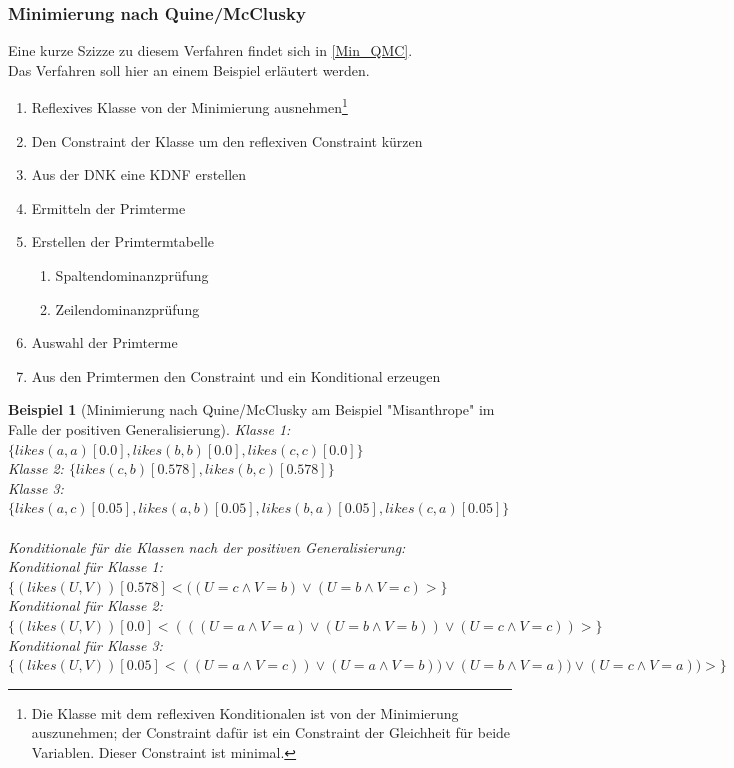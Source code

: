 \documentclass[a4paper, 11pt]{book}
\newtheorem{Bsp}{Beispiel}[section]
\begin{document}
{\subsubsection{Minimierung nach Quine/McClusky} \label{Min_Besch_QMC} 
Eine kurze Szizze zu diesem Verfahren findet sich in \ref{Min_QMC}.\\
Das Verfahren soll hier an einem Beispiel erläutert werden.
\begin{enumerate}
	\item Reflexives Klasse von der Minimierung ausnehmen\footnote{Die Klasse mit dem reflexiven Konditionalen ist von der Minimierung auszunehmen; der Constraint dafür ist ein Constraint der Gleichheit für beide Variablen. Dieser Constraint ist minimal.}
	\item Den Constraint der Klasse um den reflexiven Constraint kürzen
	\item Aus der DNK eine KDNF erstellen 
	\item Ermitteln der Primterme
	\item Erstellen der Primtermtabelle
	\begin{enumerate}
		\item Spaltendominanzprüfung
		\item Zeilendominanzprüfung
	\end{enumerate}
	\item Auswahl der Primterme
	\item Aus den Primtermen den Constraint und ein Konditional erzeugen	
\end{enumerate}
\begin{Bsp}[Minimierung nach Quine/McClusky am Beispiel "{}Misanthrope"{} im Falle der positiven Generalisierung]
	Klasse 1: $ \{likes(a,a)[0.0], likes(b,b)[0.0], likes(c,c)[0.0]\} $\\
	Klasse 2: $ \{likes(c,b)[0.578], likes(b,c)[0.578]\} $\\
	Klasse 3: $ \{likes(a,c)[0.05], likes(a,b)[0.05], likes(b,a)[0.05], likes(c,a)[0.05]\} $\\
	\\
	\noindent
	Konditionale für die Klassen nach der positiven Generalisierung:\\
	Konditional für Klasse 1: $ \{(likes(U,V))[0.578] <((U = c \land V = b) \lor (U = b \land V = c)>\} $\\
	Konditional für Klasse 2: $ \{(likes(U,V))[0.0] <(((U = a \land V = a) \lor (U = b \land V = b)) \lor (U = c \land V = c)) >\} $\\
	Konditional für Klasse 3: $ \{(likes(U,V))[0.05] <((U = a \land V = c)) \lor (U = a \land V = b)) \lor (U = b \land V = a)) \lor (U = c \land V = a))>\} $\\

\end{Bsp}}
\end{document}
